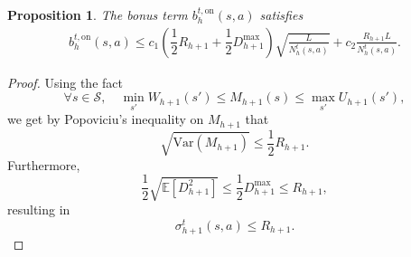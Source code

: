 \documentclass[twoside]{article}
\newtheorem{proposition}{Proposition}
\newcommand{\on}{\mathrm{on}} %
\newcommand{\bont}{b_h^{t,\on}} %
\newcommand{\lowv}{W} %
\newcommand{\highv}{U} %
\begin{document}
\begin{proposition}
The bonus term \( \bont(s,a) \) satisfies
\begin{align}
\bont(s,a) \le 
c_1\left(\dfrac12R_{h+1} + \dfrac12 D^{\max}_{h+1}\right)\sqrt{\frac{L}{N_h^t(s,a)}}
 + 
c_2\frac{R_{h+1}L}{N_h^t(s,a)}.
\label{eq:bonus_bound}
\end{align}
\end{proposition}
\begin{proof}
Using the fact 
\[\forall s \in \mathcal{S}, \quad\min_{s'} \lowv_{h+1}(s') \leq M_{h+1}(s) \leq \max_{s'} \highv_{h+1}(s'),\]
we get by Popoviciu's inequality on $M_{h+1}$ that
%
\[
\sqrt{\mathrm{Var}(M_{h+1})}\le \dfrac12 R_{h+1}.
\]
%
Furthermore,
$$\dfrac12\sqrt{\mathbb{E}[D_{h+1}^2]}\le \dfrac12 D^{\max}_{h+1} \leq R_{h+1},$$ 
resulting in  
$$\sigma_{h+1}^t(s,a)\le R_{h+1}.$$
\end{proof}
\end{document}
